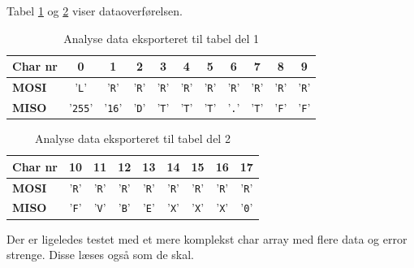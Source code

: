 Tabel \ref{table:scop_getlog1} og \ref{table:scop_getlog2} viser dataoverførelsen. 

\begin{table}[H]
	\caption{Analyse data eksporteret til tabel del 1}
	\centering
	\begin{tabular}{|l|c|c|c|c|c|c|c|c|c|c|}
		\hline 
		\textbf{Char nr} & \textbf{0} & \textbf{1} & \textbf{2} & \textbf{3} & \textbf{4} & \textbf{5} 
						 & \textbf{6} & \textbf{7} & \textbf{8} & \textbf{9}\\ 		
		\hline 
		\textbf{MOSI} & '\verb+L+' & '\verb+R+' & '\verb+R+' & '\verb+R+' & '\verb+R+' & '\verb+R+' 
						& '\verb+R+' & '\verb+R+' & '\verb+R+' & '\verb+R+'\\ 
		\hline 
		\textbf{MISO} & '\verb+255+' & '\verb+16+' & '\verb+D+' & '\verb+T+' & '\verb+T+' & '\verb+T+' 
						& '\verb+.+' & '\verb+T+' & '\verb+F+' & '\verb+F+'\\
						 
		\hline 
	\end{tabular} 
	\label{table:scop_getlog1}
\end{table}


\begin{table}[H]
	\caption{Analyse data eksporteret til tabel del 2}
	\centering
	\begin{tabular}{|l|c|c|c|c|c|c|c|c|}
		\hline 
		\textbf{Char nr} & \textbf{10} & \textbf{11} & \textbf{12} & \textbf{13}
						& \textbf{14} & \textbf{15} & \textbf{16} & \textbf{17}\\ 		
		\hline 
		\textbf{MOSI} 	& '\verb+R+' & '\verb+R+' & '\verb+R+' & '\verb+R+'
						& '\verb+R+' & '\verb+R+' & '\verb+R+' & '\verb+R+' \\ 
		\hline 
		\textbf{MISO}	& '\verb+F+' & '\verb+V+' & '\verb+B+' & '\verb+E+'
						& '\verb+X+' & '\verb+X+' & '\verb+X+' & '\verb+0+'\\
						 
		\hline 
	\end{tabular} 
	\label{table:scop_getlog2}
\end{table}

Der er ligeledes testet med et mere komplekst char array med flere data og error strenge. Disse læses også som de skal. 